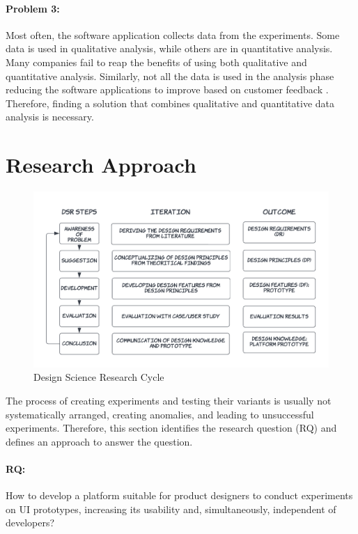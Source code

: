 \paragraph{Problem 3:} Most often, the software application collects data from the experiments. 
Some data is used in qualitative analysis, while others are in quantitative analysis.
Many companies fail to reap the benefits of using both qualitative and quantitative analysis.
Similarly, not all the data is used in the analysis phase reducing the software applications to improve based on customer feedback \cite{article:datadrive:brian}.
Therefore, finding a solution that combines qualitative and quantitative data analysis is necessary.

\section{Research Approach}
\label{intro:section:research}
\begin{figure}[ht]
    \centering
    \includegraphics[scale=0.2]{images/solution-ideas/DSRcycle.png}
    \caption{Design Science Research Cycle \cite{paper:designprinciple:vk}}
    \label{intro:fig:dps}
\end{figure}
The process of creating experiments and testing their variants is usually not systematically arranged, creating anomalies, and leading to unsuccessful experiments.
Therefore, this section identifies the research question (RQ) and defines an approach to answer the question.

\paragraph{RQ:}How to develop a platform suitable for product designers to conduct experiments on UI prototypes, increasing its usability and, simultaneously, independent of developers?

